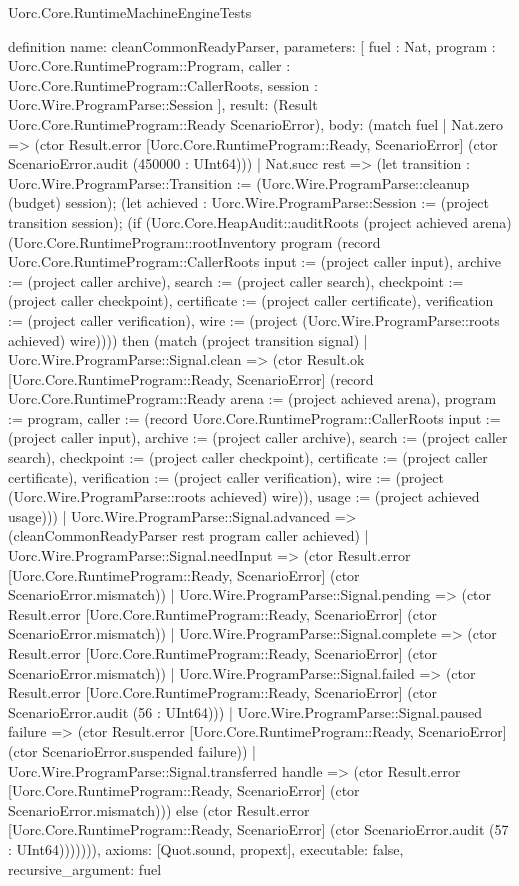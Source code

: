 \begin{lexlean}{Uorc.Core.RuntimeMachineEngineTests}
\begin{semanticmodule}
definition{
  name: cleanCommonReadyParser,
  parameters: [
    fuel : Nat,
    program : Uorc.Core.RuntimeProgram::Program,
    caller : Uorc.Core.RuntimeProgram::CallerRoots,
    session : Uorc.Wire.ProgramParse::Session
  ],
  result: (Result Uorc.Core.RuntimeProgram::Ready ScenarioError),
  body: (match fuel
    | Nat.zero => (ctor Result.error [Uorc.Core.RuntimeProgram::Ready, ScenarioError] (ctor ScenarioError.audit (450000 : UInt64)))
    | Nat.succ rest => (let transition : Uorc.Wire.ProgramParse::Transition := (Uorc.Wire.ProgramParse::cleanup (budget) session); (let achieved : Uorc.Wire.ProgramParse::Session := (project transition session); (if (Uorc.Core.HeapAudit::auditRoots (project achieved arena) (Uorc.Core.RuntimeProgram::rootInventory program (record Uorc.Core.RuntimeProgram::CallerRoots {input := (project caller input), archive := (project caller archive), search := (project caller search), checkpoint := (project caller checkpoint), certificate := (project caller certificate), verification := (project caller verification), wire := (project (Uorc.Wire.ProgramParse::roots achieved) wire)}))) then (match (project transition signal)
      | Uorc.Wire.ProgramParse::Signal.clean => (ctor Result.ok [Uorc.Core.RuntimeProgram::Ready, ScenarioError] (record Uorc.Core.RuntimeProgram::Ready {arena := (project achieved arena), program := program, caller := (record Uorc.Core.RuntimeProgram::CallerRoots {input := (project caller input), archive := (project caller archive), search := (project caller search), checkpoint := (project caller checkpoint), certificate := (project caller certificate), verification := (project caller verification), wire := (project (Uorc.Wire.ProgramParse::roots achieved) wire)}), usage := (project achieved usage)}))
      | Uorc.Wire.ProgramParse::Signal.advanced => (cleanCommonReadyParser rest program caller achieved)
      | Uorc.Wire.ProgramParse::Signal.needInput => (ctor Result.error [Uorc.Core.RuntimeProgram::Ready, ScenarioError] (ctor ScenarioError.mismatch))
      | Uorc.Wire.ProgramParse::Signal.pending => (ctor Result.error [Uorc.Core.RuntimeProgram::Ready, ScenarioError] (ctor ScenarioError.mismatch))
      | Uorc.Wire.ProgramParse::Signal.complete => (ctor Result.error [Uorc.Core.RuntimeProgram::Ready, ScenarioError] (ctor ScenarioError.mismatch))
      | Uorc.Wire.ProgramParse::Signal.failed => (ctor Result.error [Uorc.Core.RuntimeProgram::Ready, ScenarioError] (ctor ScenarioError.audit (56 : UInt64)))
      | Uorc.Wire.ProgramParse::Signal.paused failure => (ctor Result.error [Uorc.Core.RuntimeProgram::Ready, ScenarioError] (ctor ScenarioError.suspended failure))
      | Uorc.Wire.ProgramParse::Signal.transferred handle => (ctor Result.error [Uorc.Core.RuntimeProgram::Ready, ScenarioError] (ctor ScenarioError.mismatch))) else (ctor Result.error [Uorc.Core.RuntimeProgram::Ready, ScenarioError] (ctor ScenarioError.audit (57 : UInt64))))))),
  axioms: [Quot.sound, propext],
  executable: false,
  recursive_argument: fuel
}


\end{semanticmodule}
\end{lexlean}
